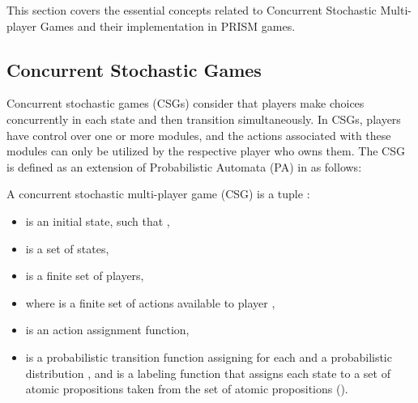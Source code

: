 This section covers the essential concepts related to Concurrent Stochastic Multi-player Games and their implementation in PRISM games. 

\subsection{Concurrent Stochastic  Games}
Concurrent stochastic games (CSGs) \cite{kwiatkowskaautomatic2021, fismancorrelated2022} consider that players make choices concurrently in each state and then transition simultaneously. In CSGs, players have control over one or more modules, and the actions associated with these modules can only be utilized by the respective player who owns them. The CSG is defined as an extension of Probabilistic Automata (PA) \cite{ref27} in \cite{kwiatkowskaautomatic2021, fismancorrelated2022} as follows:


\begin{mydef} \label{def:csg} \normalfont A concurrent stochastic multi-player game (CSG) is a tuple :

\begin{itemize}
	\item {} is an initial state, such that ,
	\item {} is a set of states,
	\item {} is a finite set of players,
	 \item {} where  is a finite set of actions available to player ,
     \item {} is an action assignment function,
 
    \item {} is a probabilistic transition function assigning for each  and  a probabilistic distribution , and  is a labeling function that assigns each state    to a set of atomic propositions taken from the set of atomic propositions ().
\end{itemize}
\end{mydef}



